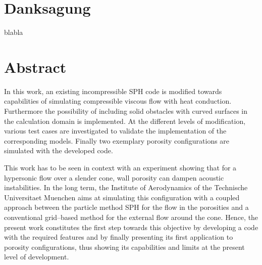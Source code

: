 \documentclass[11pt,a4paper,twoside]{report}
\begin{document}
\pagestyle{fancyplain}


\renewcommand{\sectionmark}[1]{\markright{#1}{}}
\renewcommand{\chaptermark}[1]{\markboth{#1}{}}
% 


\pagestyle{empty}
\newpage
\cleardoublepage


 \setcounter{page}{3}
%
\clearpage
\chapter*{Danksagung}
blabla
\mdseries
\cleardoublepage

\chapter*{Abstract}

In this work, an existing incompressible SPH code is modified towards capabilities of simulating compressible viscous flow with heat conduction. Furthermore the possibility of including solid obstacles with curved surfaces in the calculation domain is implemented. At the different levels of modification, various test cases are investigated to validate the implementation of the corresponding models. Finally two exemplary porosity configurations are simulated with the developed code.

This work has to be seen in context with an experiment showing that for a hypersonic flow over a slender cone, wall porosity can dampen acoustic instabilities. In the long
term, the Institute of Aerodynamics of the Technische Universitaet Muenchen aims at simulating this configuration with a coupled approach between the particle method SPH for the flow in the porosities and a conventional grid--based method for the external flow around the cone. Hence, the present work constitutes the first step towards this objective by developing a code with the required features and by finally presenting its first application to porosity configurations, thus showing its capabilities and limits at the present level of development.

\cleardoublepage %

\fancyhf{}
\cfoot{}
\end{document}
